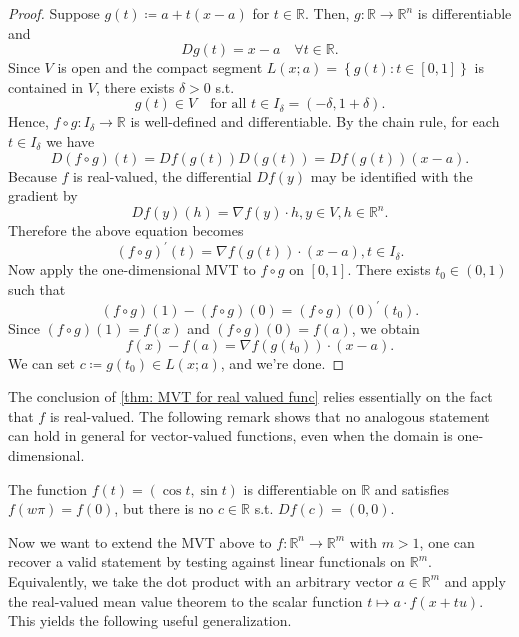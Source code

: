\begin{proof}
   Suppose \(g(t) \coloneqq a + t(x - a)\) for \(t \in \mathbb{R} \). Then, \(g: \mathbb{R} \to \mathbb{R} ^n\) is differentiable and 
   \[
    Dg(t) = x - a \quad \forall t \in \mathbb{R}.
   \]   
   Since \(V\) is open and the compact segment \(L(x;a) = \left\{ g(t) : t \in [0, 1] \right\} \) is contained in \(V\), there exists \(\delta > 0\) s.t. 
   \[
    g(t) \in V \quad \text{for all } t \in I_\delta = (-\delta , 1 + \delta ). 
   \]    
   Hence, \(f \circ g : I_\delta \to \mathbb{R}\) is well-defined and differentiable. By the chain rule, for each \(t \in I_\delta \) we have 
   \[
    D(f \circ g)(t) = Df(g(t)) D(g(t)) = Df(g(t))(x-a).
   \]  
   Because \(f\) is real-valued, the differential \(Df(y)\) may be identified with the gradient by 
   \[
    Df(y)(h) = \nabla f(y) \cdot h, y \in V, h \in \mathbb{R} ^n.
   \]  
   Therefore the above equation becomes
   \[
    (f \circ g)^{\prime} (t) = \nabla f(g(t)) \cdot (x - a), t \in I_\delta.
   \]
   Now apply the one-dimensional MVT to \(f \circ g\) on \([0, 1]\). There exists \(t_0 \in (0, 1)\) such that 
   \[
    (f \circ g)(1) - (f \circ g)(0) = (f \circ g)(0)^{\prime} (t_0).
   \]   
   Since \((f \circ g)(1) = f(x)\) and \((f \circ g)(0) = f(a)\), we obtain 
   \[
    f(x) - f(a) = \nabla f(g(t_0)) \cdot ( x - a).
   \]  
   We can set \(c\coloneqq g(t_0) \in L(x;a)\), and we're done. 
\end{proof}

The conclusion of \autoref{thm: MVT for real valued func} relies essentially on the fact that \(f\) is real-valued. The following remark shows that no analogous statement can hold in general for vector-valued functions, even when the domain is one-dimensional. 

\begin{remark}
    The function \(f(t) = (\cos t, \sin t)\) is differentiable on \(\mathbb{R} \) and satisfies \(f(w \pi ) = f(0)\), but there is no \(c \in \mathbb{R} \) s.t. \(Df(c) = (0, 0)\).     
\end{remark}

Now we want to extend the MVT above to \(f: \mathbb{R} ^n \to \mathbb{R} ^m\) with \(m > 1\), one can recover a valid statement by testing against linear functionals on \(\mathbb{R} ^m\). Equivalently, we take the dot product with an arbitrary vector \(a \in \mathbb{R} ^m\) and apply the real-valued mean value theorem to the scalar function \(t \mapsto a \cdot f(x + tu)\). This yields the following useful generalization.     

